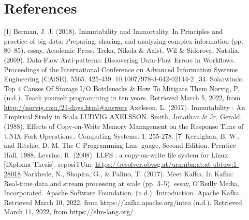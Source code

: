 \documentclass[12pt,twoside]{article}
\begin{document}



\newpage
{}
\setcounter{page}{1}
\section{References}
[1] Berman, J. J. (2018). Immutability and Immortality. In Principles and practice of big data: Preparing, sharing, and analyzing complex information (pp. 80–85). essay, Academic Press. \newline
[2] Trcka, Nikola \& Aalst, Wil \& Sidorova, Natalia. (2009). Data-Flow Anti-patterns: Discovering Data-Flow Errors in Workflows. Proceedings of the International Conference on Advanced Information Systems Engineering (CAiSE). 5565. 425-439. 10.1007/978-3-642-02144-2_34. \newline
[3] Solarwinds: Top 4 Causes Of Storage I/O Bottlenecks \& How To Mitigate Them \newline
[4] Norvig, P. (n.d.). Teach yourself programming in ten years. Retrieved March 5, 2022, from \url{http://norvig.com/21-days.html#answers} \newline
[5] Axelsson, L. (2017). Immutability : An Empirical Study in Scala LUDVIG AXELSSON. \newline 
[6] Smith, Jonathan \& Jr, Gerald. (1988). Effects of Copy-on-Write Memory Management on the Response Time of UNIX Fork Operations.. Computing Systems. 1. 255-278.
[7] Kernighan, B. W., and Ritchie, D. M. The C Programming Lan-
guage, Second Edition. Prentice Hall, 1988. \newline
[8] Levrinc, R. (2008). LLFS : a copy-on-write file system for Linux [Diploma Thesis]. reposiTUm. \url{https://resolver.obvsg.at/urn:nbn:at:at-ubtuw:1-28018} \newline
[9] Narkhede, N., Shapira, G., \& Palino, T. (2017). Meet Kafka. In Kafka: Real-time data and stream processing at scale (pp. 3–5). essay, O'Reilly Media, Incorporated. \newline
[10] Apache Software Foundation. (n.d.). Introduction. Apache Kafka. Retrieved March 10, 2022, from https://kafka.apache.org/intro \newline
[11]  (n.d.). Retrieved March 11, 2022, from https://elm-lang.org/ 
\end{document}

